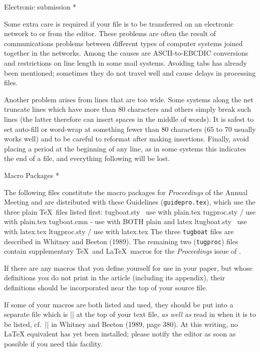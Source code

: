 \head * Electronic submission *
 
Some extra care is required if your file is to be transferred on an
electronic network to or from the editor.  These problems are often the
result of communications problems between different types of computer
systems joined together in the networks.  Among the causes are {\SMC
ASCII}-to-{\SMC EBCDIC} conversions and restrictions on line length in
some mail systems.  Avoiding tabs has already been mentioned; sometimes
they do not travel well and cause delays in processing files.
 
Another problem arises from lines that are too wide.  Some systems along
the net truncate lines which have more than 80 characters and others
simply break such lines (the latter therefore can insert spaces in the
middle of words).  It is safest to set auto-fill or word-wrap at
something fewer than 80 characters (65 to 70 usually works well) and to
be careful to reformat after making insertions.  Finally, avoid placing
a period at the beginning of any line, as in some systems this indicates
the end of a file, and everything following will be lost.
 
\head * Macro Packages *
 
The following files constitute the macro packages for {\sl
Proceedings\/} of the Annual Meeting and are distributed with these
Guidelines ({\tt guidepro.tex}), which use the three plain \TeX\ files
listed first:
\verbatim
tugboat.sty   \ use with plain.tex
tugproc.sty   / use with plain.tex
tugboat.cmn   - use with BOTH
                plain and latex
ltugboat.sty  \ use with latex.tex
ltugproc.sty  / use with latex.tex
\endverbatim
The three {\tt *tugboat} files are described in Whitney and Beeton
(1989).  The remaining two ({\tt *tugproc}) files contain supplementary
\TeX\ and \LaTeX\ macros for the {\sl Proceedings\/} issue of \TUB.
 
If there are any macros that you define yourself for use in your paper,
but whose definitions you do not print in the article (including its
appendix), their definitions should be incorporated near the top of your
source file.
 
If some of your macros are both listed and used, they should be put into
a separate file which is || at the top of your text file, {\it as
well as\/} read in when it is to be listed, cf.\ |\verbfile| in Whitney
and Beeton (1989, page 380).  At this writing, no \LaTeX{} equivalent has
yet been installed; please notify the editor as soon as possible if you
need this facility.
 
